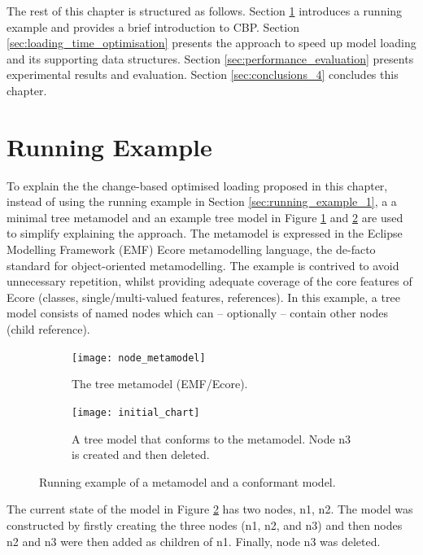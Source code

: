 The rest of this chapter is structured as follows. Section \ref{sec:case_study} introduces a running example and provides a brief introduction to CBP.
Section \ref{sec:loading_time_optimisation} presents the approach to speed up model loading and its supporting data structures. Section \ref{sec:performance_evaluation} presents experimental results and evaluation.  Section \ref{sec:conclusions_4} concludes this chapter.

\section{Running Example}
\label{sec:case_study}
To explain the the change-based optimised loading proposed in this chapter, instead of using the running example in Section \ref{sec:running_example_1}, a a minimal tree metamodel and an example tree model in Figure \ref{fig:tree_metamodel} and \ref{fig:initial_model} are used to simplify explaining the approach. 
The metamodel is expressed in the Eclipse Modelling Framework (EMF) Ecore metamodelling language, the de-facto standard for object-oriented metamodelling.  The example is contrived to avoid unnecessary repetition, whilst providing adequate coverage of the core features of Ecore (classes, single/multi-valued features, references).
In this example, a tree model consists of named nodes which can -- optionally -- contain other nodes (\textsf{child} reference).

\begin{figure}[ht]
\begin{subfigure}[t]{0.29\linewidth}
\centering
\texttt{[image: node\_metamodel]}
\caption{The tree metamodel (EMF/Ecore).}
\label{fig:tree_metamodel}
\end{subfigure}
\hfill
\begin{subfigure}[h]{0.69\linewidth}
\centering
\texttt{[image: initial\_chart]}
\caption{A tree model that conforms to the  metamodel.  Node n3 is created and then deleted.}
\label{fig:initial_model}
\end{subfigure}
\caption{Running example of a metamodel and a conformant model.}
\label{fig:append_speed}
\end{figure}

The current state of the model in Figure \ref{fig:initial_model} has two nodes, \textsf{n1}, \textsf{n2}.  The model was constructed by firstly creating the three nodes (\textsf{n1}, \textsf{n2}, and \textsf{n3}) and then nodes \textsf{n2} and \textsf{n3} were then added as children of \textsf{n1}. Finally, node \textsf{n3} was deleted.

